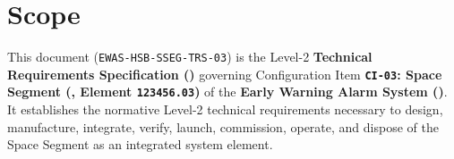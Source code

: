\section{Scope}

This document (\texttt{EWAS-HSB-SSEG-TRS-03}) is the Level-2 \textbf{Technical Requirements Specification ()} governing Configuration Item \textbf{\texttt{CI-03}: Space Segment (,  Element \texttt{123456.03})} of the \textbf{Early Warning Alarm System ()}. It establishes the normative Level-2 technical requirements necessary to design, manufacture, integrate, verify, launch, commission, operate, and dispose of the  Space Segment as an integrated system element.

